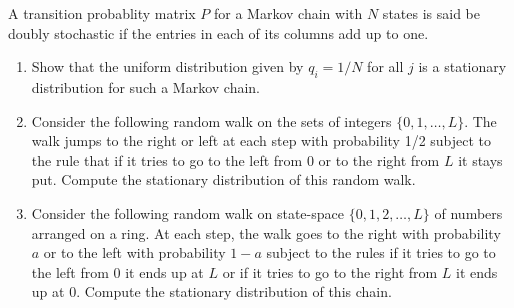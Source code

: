 \begin{problem}
    A transition probablity matrix \( P \) for a Markov chain with \( N \) states is said be doubly stochastic if the entries in each of its columns add up to one.
\begin{enumerate}[nolistsep,label=(\alph*)]
\item Show that the uniform distribution given by \( q_i = 1/N \) for all \( j \) is a stationary distribution for such a Markov chain.
\item Consider the following random walk on the sets of integers \( \{0, 1, \ldots, L\} \). The walk jumps to the right or left at each step with probability 1/2 subject to the rule that if it tries to go to the left from 0 or to the right from \( L \) it stays put. Compute the stationary distribution of this random walk.
\item Consider the following random walk on state-space \( \{0, 1, 2, \ldots, L\} \) of numbers arranged on a ring. At each step, the walk goes to the right with probability \( a \) or to the left with probability \( 1 - a \) subject to the rules if it tries to go to the left from 0 it ends up at \( L \) or if it tries to go to the right from \( L \) it ends up at 0. Compute the stationary distribution of this chain.
\end{enumerate}
\end{problem}

